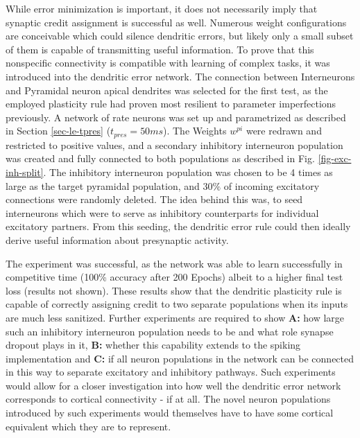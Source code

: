 While error minimization is important, it does not necessarily imply that synaptic credit assignment is successful as
well. Numerous weight configurations are conceivable which could silence dendritic errors, but likely only a small
subset of them is capable of transmitting useful information. To prove that this nonspecific connectivity is compatible
with learning of complex tasks, it was introduced into the dendritic error network. The connection between Interneurons
and Pyramidal neuron apical dendrites was selected for the first test, as the employed plasticity rule had proven most
resilient to parameter imperfections previously. A network of rate neurons was set up and parametrized as described in
Section \ref{sec-le-tpres} ($t_{pres}= 50ms$). The Weights $w^{pi}$ were redrawn and restricted to positive values, and
a secondary inhibitory interneuron population was created and fully connected to both populations as described in Fig.
\ref{fig-exc-inh-split}. The inhibitory interneuron population was chosen to be 4 times as large as the target pyramidal
population, and $30\%$ of incoming excitatory connections were randomly deleted. The idea behind this was, to seed
interneurons which were to serve as inhibitory counterparts for individual excitatory partners. From this seeding, the
dendritic error rule could then ideally derive useful information about presynaptic activity.

The experiment was successful, as the network was able to learn successfully in competitive time (100\% accuracy after
200 Epochs) albeit to a higher final test loss (results not shown). These results show that the dendritic plasticity
rule is capable of correctly assigning credit to two separate populations when its inputs are much less sanitized.
Further experiments are required to show \textbf{A:} how large such an inhibitory interneuron population needs to be and
what role synapse dropout plays in it, \textbf{B:} whether this capability extends to the spiking implementation and
\textbf{C:} if all neuron populations in the network can be connected in this way to separate excitatory and inhibitory
pathways. Such experiments would allow for a closer investigation into how well the dendritic error network corresponds
to cortical connectivity - if at all. The novel neuron populations introduced by such experiments would themselves have
to have some cortical equivalent which they are to represent. 



